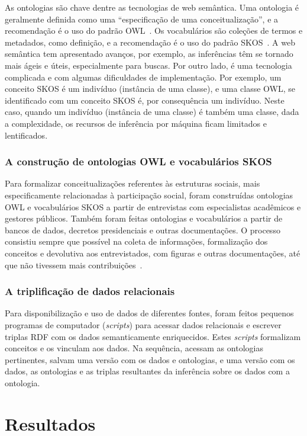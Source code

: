 \documentclass[a4paper,openright,12pt]{report} %
\begin{document}
As ontologias são chave dentre as tecnologias de web semântica.
Uma ontologia é geralmente definida como uma ``especificação de
uma conceitualização'', e a recomendação é o uso do padrão OWL~\cite{owl}.
Os vocabulários são coleções de termos e metadados, como definição,
e a recomendação é o uso do padrão SKOS~\cite{skos}.
A web semântica tem apresentado avanços,
por exemplo, as inferências têm se tornado mais ágeis e úteis, especialmente para buscas.
Por outro lado, é uma tecnologia
complicada e com algumas dificuldades de implementação.
Por exemplo, um conceito SKOS é um indivíduo (instância de uma classe),
e uma classe OWL,
se identificado com um conceito SKOS é, por consequência um
indivíduo.
Neste caso, quando um indivíduo (instância de uma classe) é
também uma classe, dada a complexidade, os recursos de inferência por máquina 
ficam limitados e lentificados.

\subsection{A construção de ontologias OWL e vocabulários SKOS}

Para formalizar conceitualizações referentes às estruturas sociais,
mais especificamente relacionadas à participação social,
foram construídas ontologias OWL e vocabulários SKOS a partir de entrevistas
com especialistas acadêmicos e gestores públicos.
Também foram feitas ontologias e vocabulários a partir de bancos de dados,
decretos presidenciais e outras documentações.
O processo  consistiu sempre que possível na coleta de informações,
formalização dos conceitos e devolutiva aos entrevistados,
com figuras e outras documentações, até que não tivessem
mais contribuições~\cite{pnud5}.

\subsection{A triplificação de dados relacionais}
Para disponibilização e uso de dados de diferentes fontes, foram
feitos pequenos programas de computador (\emph{scripts}) para
acessar dados relacionais e escrever triplas RDF com os dados semanticamente enriquecidos.
Estes \emph{scripts} formalizam conceitos e os vinculam aos dados.
Na sequência, acessam as ontologias pertinentes, salvam
uma versão com os dados e ontologias, e uma versão
com os dados, as ontologias e as triplas resultantes da inferência sobre os dados com a ontologia.


\chapter{Resultados}
\end{document}

